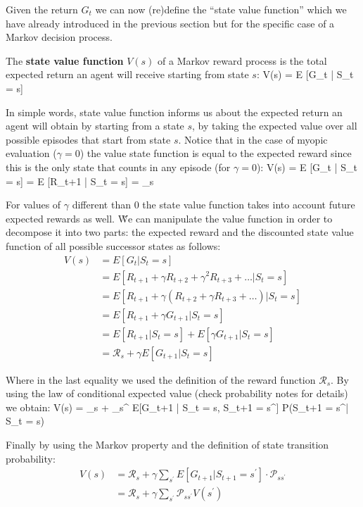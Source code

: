 Given the return $G_t$ we can now (re)define the ``state value function'' which we have already introduced in the 
previous section but for the specific case of a Markov decision process.

The \textbf{state value function } $V(s)$ of a Markov reward process is the total expected return an agent will 
receive starting from state $s$:
\bse
V(s) = E [G_t | S_t = s]
\ese
\ed

In simple words, state value function informs us about the expected return an agent will obtain by starting from a 
state $s$, by taking the expected value over all possible episodes that start from state $s$. Notice that in the 
case of myopic evaluation ($\gamma=0$) the value state function is equal to the expected reward since this is the 
only state that counts in any episode (for $\gamma=0$):
\bse
V(s) = E [G_t | S_t = s] = E [R_{t+1} | S_t = s] = _{s}
\ese

For values of $\gamma$ different than 0 the state value function takes into account future expected rewards as well. \v

We can manipulate the value function in order to decompose it into two parts: the expected reward and the discounted 
state value function of all possible successor states as follows:
{\setlength{\jot}{10pt}
\begin{align*}
V(s) &= E [G_t | S_t = s] \\
&= E [R_{t+1} + \gamma R_{t+2} + \gamma^2 R_{t+3} + \ldots | S_t = s] \\
&= E [R_{t+1} + \gamma (R_{t+2} + \gamma R_{t+3} + \ldots) | S_t = s] \\
&= E [R_{t+1} + \gamma G_{t+1} | S_t = s] \\
&= E [R_{t+1}| S_t = s] + E[\gamma G_{t+1} | S_t = s] \\
&= \mathcal{R}_{s} + \gamma E[G_{t+1} | S_t = s]
\end{align*}}

\vspace{-10pt}

Where in the last equality we used the definition of the reward function $\mathcal{R}_{s}$. By using the law of 
conditional expected value (check probability notes for details) we obtain:
\bse
V(s) = _{s} + \gamma \sum_{s^\prime} E[G_{t+1} | S_t = s, S_{t+1} = s^\prime] 
\cdot P(S_{t+1} = s^\prime | S_t = s)
\ese

Finally by using the Markov property and the definition of state transition probability:
{\setlength{\jot}{10pt}
\begin{align*}
V(s) &= \mathcal{R}_{s} + \gamma \sum_{s^\prime} E[G_{t+1} | S_{t+1} = s^\prime] \cdot \mathcal{P}_{ss^\prime} \\
&= \mathcal{R}_{s} + \gamma \sum_{s^\prime} \mathcal{P}_{ss^\prime} V(s^\prime)
\end{align*}}

